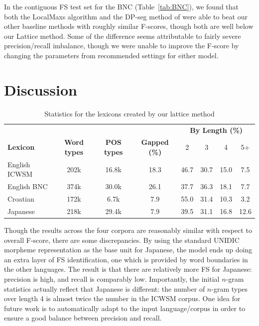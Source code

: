\documentclass[11pt,letterpaper]{article}
\newcommand{\z}{\phantom{0}}
\newcommand{\tabref}[2][]{Table#1~\ref{#2}\xspace}
\begin{document}
In the contiguous FS test set for the BNC (\tabref{tab:BNC}), we found that both the LocalMaxs algorithm and the DP-seg method of  were able to beat our other baseline methods with roughly similar F-scores, though both are well below our Lattice method. Some of the difference seems attributable to fairly severe precision/recall imbalance, though we were unable to improve the F-score by changing the parameters from recommended settings for either model.


\section{Discussion} \label{sec:discussion}


\begin{table}[!bt]
 
 \begin{center}
 \begin{tabular}{lccccccc}
\toprule
& & & & \multicolumn{4}{c}{\bf{By Length (\%) }} \\
       \cmidrule(lr){5-8}	
\bf{Lexicon} & \bf{Word types} & \bf{POS types} & \bf{Gapped} (\%) & 2 & 3 & 4 & 5+ \\ 
\midrule
English ICWSM & 202k & 16.8k & 18.3 & 46.7 & 30.7 & 15.0 & \z7.5  \\
English BNC & 374k &  30.0k& 26.1& 37.7 & 36.3 & 18.1 & \z7.7 \\
Croatian & 172k & \z6.7k & \z7.9& 55.0& 31.4 & 10.3 & \z3.2 \\
Japanese & 218k &  29.4k &\z7.9& 39.5 & 31.1& 16.8 & 12.6 \\
\bottomrule
\end{tabular}
  \caption{Statistics for the lexicons created by our lattice method}
	 \label{tab:lexstats}

 \end{center}


 \end{table}


Though the results across the four corpora are reasonably similar with respect to overall F-score, there are some discrepancies. By using the standard UNIDIC morpheme representation as the base unit for Japanese, the model ends up doing an extra layer of FS identification, one which is provided by word boundaries in the other languages. The result is that there are relatively more FS for Japanese: precision is high, and recall is comparably low.  Importantly, the initial $n$-gram statistics actually reflect that Japanese is different: the number of $n$-gram types over length 4 is almost twice the number in the ICWSM corpus. One idea for future work is to automatically adapt to the input language/corpus in order to ensure a good balance between precision and recall.
\end{document}
